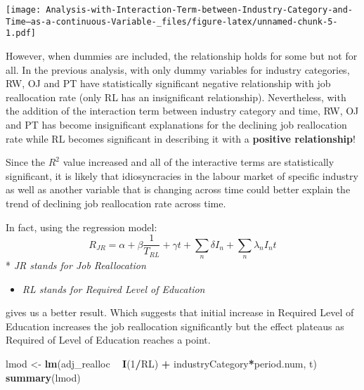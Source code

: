 \documentclass[
]{article}
\newenvironment{Shaded}{\begin{snugshade}}{\end{snugshade}}
\newcommand{\DecValTok}[1]{\textcolor[rgb]{0.00,0.00,0.81}{#1}}
\newcommand{\KeywordTok}[1]{\textcolor[rgb]{0.13,0.29,0.53}{\textbf{#1}}}
\newcommand{\NormalTok}[1]{#1}
\newcommand{\OperatorTok}[1]{\textcolor[rgb]{0.81,0.36,0.00}{\textbf{#1}}}
\newcommand{\StringTok}[1]{\textcolor[rgb]{0.31,0.60,0.02}{#1}}
\providecommand{\tightlist}{%
  \setlength{\itemsep}{0pt}\setlength{\parskip}{0pt}}
\begin{document}
\texttt{[image: Analysis-with-Interaction-Term-between-Industry-Category-and-Time--as-a-continuous-Variable-\_files/figure-latex/unnamed-chunk-5-1.pdf]}

However, when dummies are included, the relationship holds for some but
not for all. In the previous analysis, with only dummy variables for
industry categories, RW, OJ and PT have statistically significant
negative relationship with job reallocation rate (only RL has an
insignificant relationship). Nevertheless, with the addition of the
interaction term between industry category and time, RW, OJ and PT has
become insignificant explanations for the declining job reallocation
rate while RL becomes significant in describing it with a
\textbf{positive relationship}!

Since the \(R^2\) value increased and all of the interactive terms are
statistically significant, it is likely that idiosyncracies in the
labour market of specific industry as well as another variable that is
changing across time could better explain the trend of declining job
reallocation rate across time.

In fact, using the regression model:
\[R_{JR} = \alpha + \beta \frac{1}{T_{RL}} + \gamma t + \sum_n \delta I_n + \sum_n \lambda_n I_n t\]
* \emph{JR stands for Job Reallocation}

\begin{itemize}
\tightlist
\item
  \emph{RL stands for Required Level of Education}
\end{itemize}

gives us a better result. Which suggests that initial increase in
Required Level of Education increases the job reallocation significantly
but the effect plateaus as Required of Level of Education reaches a
point.

\begin{Shaded}
\begin{Highlighting}[]
\NormalTok{lmod <-}\StringTok{ }\KeywordTok{lm}\NormalTok{(adj_realloc }\OperatorTok{~}\StringTok{ }\KeywordTok{I}\NormalTok{(}\DecValTok{1}\OperatorTok{/}\NormalTok{RL) }\OperatorTok{+}\StringTok{ }\NormalTok{industryCategory}\OperatorTok{*}\NormalTok{period.num, t)}
\KeywordTok{summary}\NormalTok{(lmod)}
\end{Highlighting}
\end{Shaded}
\end{document}
